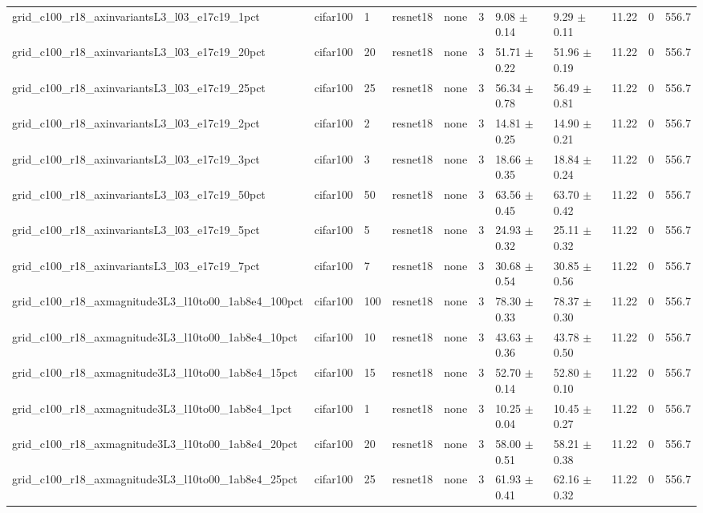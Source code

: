 \begin{tabular}{lllllllllll}
grid_c100_r18_axinvariantsL3_l03_e17c19_1pct & cifar100 & 1 & resnet18 & none & 3 & 9.08 $\pm$ 0.14 & 9.29 $\pm$ 0.11 & 11.22 & 0 & 556.7 \\
grid_c100_r18_axinvariantsL3_l03_e17c19_20pct & cifar100 & 20 & resnet18 & none & 3 & 51.71 $\pm$ 0.22 & 51.96 $\pm$ 0.19 & 11.22 & 0 & 556.7 \\
grid_c100_r18_axinvariantsL3_l03_e17c19_25pct & cifar100 & 25 & resnet18 & none & 3 & 56.34 $\pm$ 0.78 & 56.49 $\pm$ 0.81 & 11.22 & 0 & 556.7 \\
grid_c100_r18_axinvariantsL3_l03_e17c19_2pct & cifar100 & 2 & resnet18 & none & 3 & 14.81 $\pm$ 0.25 & 14.90 $\pm$ 0.21 & 11.22 & 0 & 556.7 \\
grid_c100_r18_axinvariantsL3_l03_e17c19_3pct & cifar100 & 3 & resnet18 & none & 3 & 18.66 $\pm$ 0.35 & 18.84 $\pm$ 0.24 & 11.22 & 0 & 556.7 \\
grid_c100_r18_axinvariantsL3_l03_e17c19_50pct & cifar100 & 50 & resnet18 & none & 3 & 63.56 $\pm$ 0.45 & 63.70 $\pm$ 0.42 & 11.22 & 0 & 556.7 \\
grid_c100_r18_axinvariantsL3_l03_e17c19_5pct & cifar100 & 5 & resnet18 & none & 3 & 24.93 $\pm$ 0.32 & 25.11 $\pm$ 0.32 & 11.22 & 0 & 556.7 \\
grid_c100_r18_axinvariantsL3_l03_e17c19_7pct & cifar100 & 7 & resnet18 & none & 3 & 30.68 $\pm$ 0.54 & 30.85 $\pm$ 0.56 & 11.22 & 0 & 556.7 \\
grid_c100_r18_axmagnitude3L3_l10to00_1ab8e4_100pct & cifar100 & 100 & resnet18 & none & 3 & 78.30 $\pm$ 0.33 & 78.37 $\pm$ 0.30 & 11.22 & 0 & 556.7 \\
grid_c100_r18_axmagnitude3L3_l10to00_1ab8e4_10pct & cifar100 & 10 & resnet18 & none & 3 & 43.63 $\pm$ 0.36 & 43.78 $\pm$ 0.50 & 11.22 & 0 & 556.7 \\
grid_c100_r18_axmagnitude3L3_l10to00_1ab8e4_15pct & cifar100 & 15 & resnet18 & none & 3 & 52.70 $\pm$ 0.14 & 52.80 $\pm$ 0.10 & 11.22 & 0 & 556.7 \\
grid_c100_r18_axmagnitude3L3_l10to00_1ab8e4_1pct & cifar100 & 1 & resnet18 & none & 3 & 10.25 $\pm$ 0.04 & 10.45 $\pm$ 0.27 & 11.22 & 0 & 556.7 \\
grid_c100_r18_axmagnitude3L3_l10to00_1ab8e4_20pct & cifar100 & 20 & resnet18 & none & 3 & 58.00 $\pm$ 0.51 & 58.21 $\pm$ 0.38 & 11.22 & 0 & 556.7 \\
grid_c100_r18_axmagnitude3L3_l10to00_1ab8e4_25pct & cifar100 & 25 & resnet18 & none & 3 & 61.93 $\pm$ 0.41 & 62.16 $\pm$ 0.32 & 11.22 & 0 & 556.7 \\

\end{tabular}
